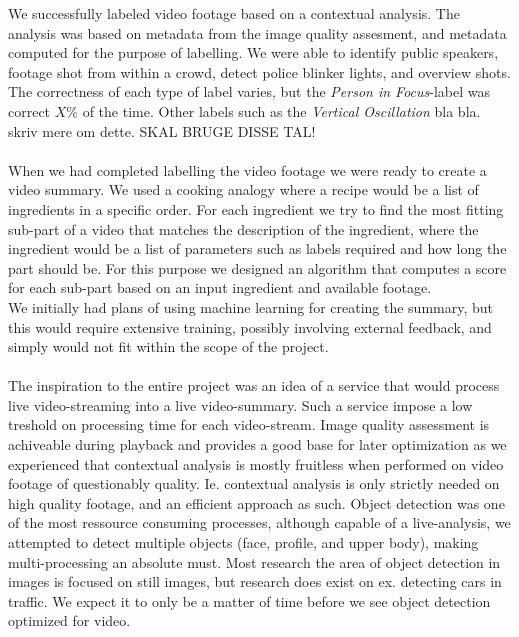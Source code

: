 We successfully labeled video footage based on a contextual analysis. The analysis was based on metadata from the image quality assesment, and metadata computed for the purpose of labelling. We were able to identify public speakers, footage shot from within a crowd, detect police blinker lights, and overview shots. 
\\
The correctness of each type of label varies, but the \emph{Person in Focus}-label was correct $X\%$ of the time. Other labels such as the \emph{Vertical Oscillation} bla bla. skriv mere om dette. SKAL BRUGE DISSE TAL!
\\\\
When we had completed labelling the video footage we were ready to create a video summary. We used a cooking analogy where a recipe would be a list of ingredients in a specific order. For each ingredient we try to find the most fitting sub-part of a video that matches the description of the ingredient, where the ingredient would be a list of parameters such as labels required and how long the part should be. For this purpose we designed an algorithm that computes a score for each sub-part based on an input ingredient and available footage.\\
We initially had plans of using machine learning for creating the summary, but this would require extensive training, possibly involving external feedback, and simply would not fit within the scope of the project.
\\\\
The inspiration to the entire project was an idea of a service that would process live video-streaming into a live video-summary. Such a service impose a low treshold on processing time for each video-stream. Image quality assessment is achiveable during playback and provides a good base for later optimization as we experienced that contextual analysis is mostly fruitless when performed on video footage of questionably quality. Ie. contextual analysis is only strictly needed on high quality footage, and an efficient approach as such. Object detection was one of the most ressource consuming processes, although capable of a live-analysis, we attempted to detect multiple objects (face, profile, and upper body), making multi-processing an absolute must. Most research the area of object detection in images is focused on still images, but research does exist on ex. detecting cars in traffic. We expect it to only be a matter of time before we see object detection optimized for video.

